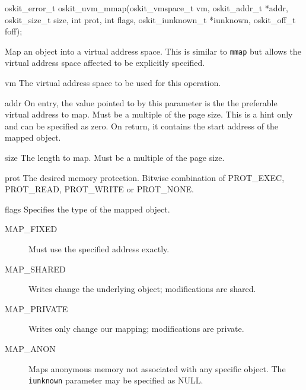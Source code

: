 \begin{apisyn}

        \funcproto oskit_error_t oskit_uvm_mmap(oskit_vmspace_t vm,
        \inoutparam oskit_addr_t *addr,
                               oskit_size_t size, int prot, int flags,
                               oskit_iunknown_t *iunknown, oskit_off_t foff);
\end{apisyn}
\begin{apidesc}
        Map an object into a virtual address space.  This is similar to
        \texttt{mmap} but allows the virtual address space affected to be
        explicitly specified.
\end{apidesc}
\begin{apiparm}
        \item[vm]
                The virtual address space to be used for this operation.

        \item[addr]
                On entry, the value pointed to by this parameter is the
                the preferable virtual address to map.  Must be a multiple
                of the page size.  This is a hint only and can be specified
                as zero.  On return, it contains the start address of the
                mapped object.

        \item[size]
                The length to map.  Must be a multiple of the page size.

        \item[prot]
                The desired memory protection.  Bitwise combination of
                PROT_EXEC, PROT_READ, PROT_WRITE or PROT_NONE.

        \item[flags]
                Specifies the type of the mapped object.
                \begin{description}
                  \item[MAP_FIXED]
                    Must use the specified address exactly.
                  \item[MAP_SHARED]
                    Writes change the underlying object; modifications
                    are shared.
                  \item[MAP_PRIVATE]
                    Writes only change our mapping; modifications are private.
                  \item[MAP_ANON]
                    Maps anonymous memory not associated with any specific
                    object.  The {\tt iunknown} parameter may be specified
                    as NULL.
                \end{description}


\end{apiparm}
